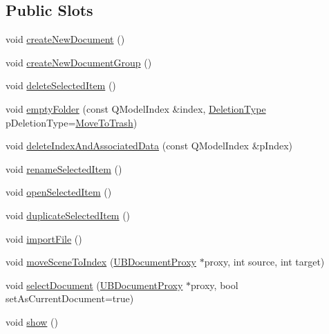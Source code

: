 \subsection*{Public Slots}
\begin{DoxyCompactItemize}
\item 
void \hyperlink{class_u_b_document_controller_a367127ee254faeb89b4a229e958f6072}{create\-New\-Document} ()
\item 
void \hyperlink{class_u_b_document_controller_a201a8f0b6cf3dbd9d221147e5f50bf48}{create\-New\-Document\-Group} ()
\item 
void \hyperlink{class_u_b_document_controller_a585faed52b3ca1aa66bad2d0383eb026}{delete\-Selected\-Item} ()
\item 
void \hyperlink{class_u_b_document_controller_a71e0a0bc3ee2521a969739fb6c420c92}{empty\-Folder} (const Q\-Model\-Index \&index, \hyperlink{class_u_b_document_controller_ad7fc793af571ee4203a71db414e0829e}{Deletion\-Type} p\-Deletion\-Type=\hyperlink{class_u_b_document_controller_ad7fc793af571ee4203a71db414e0829eafb747ec402e2dadc84431f1be50b9e2c}{Move\-To\-Trash})
\item 
void \hyperlink{class_u_b_document_controller_a4dd7b6932ca6db035202a206c64c793b}{delete\-Index\-And\-Associated\-Data} (const Q\-Model\-Index \&p\-Index)
\item 
void \hyperlink{class_u_b_document_controller_a68fb7aced33362d29dbf6a67a6d99fb2}{rename\-Selected\-Item} ()
\item 
void \hyperlink{class_u_b_document_controller_ae617ef6d5f7b83dd7e121da6fb389799}{open\-Selected\-Item} ()
\item 
void \hyperlink{class_u_b_document_controller_a778970871dc49c20eb0812f352a65f75}{duplicate\-Selected\-Item} ()
\item 
void \hyperlink{class_u_b_document_controller_af5065d414f3ca99eee1d7c21930bde29}{import\-File} ()
\item 
void \hyperlink{class_u_b_document_controller_a22171aa28307863bd0340d75aa36718d}{move\-Scene\-To\-Index} (\hyperlink{class_u_b_document_proxy}{U\-B\-Document\-Proxy} $\ast$proxy, int source, int target)
\item 
void \hyperlink{class_u_b_document_controller_ab4fa92eecfbd5ba3493bf7892cdd8ae0}{select\-Document} (\hyperlink{class_u_b_document_proxy}{U\-B\-Document\-Proxy} $\ast$proxy, bool set\-As\-Current\-Document=true)
\item 
void \hyperlink{class_u_b_document_controller_a515c0abd53c46d51464ebca366e757fc}{show} ()
\item 

\end{DoxyCompactItemize}
